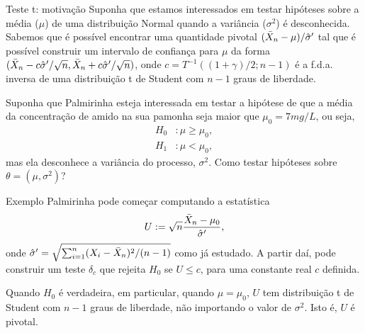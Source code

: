 \begin{frame}{Teste t: motivação}
 Suponha que estamos interessados em testar hipóteses sobre a média ($\mu$) de uma distribuição Normal quando a variância ($\sigma^2$) é desconhecida.
 Sabemos que é possível encontrar uma quantidade pivotal $(\bar{X}_n-\mu)/\hat{\sigma}^\prime$ tal que é possível construir um intervalo de confiança para $\mu$ da forma $( \bar{X}_n - c\hat{\sigma}^\prime/\sqrt{n}, \bar{X}_n + c\hat{\sigma}^\prime/\sqrt{n} )$, onde $c = T^{-1}((1 + \gamma)/2; n-1)$ é a f.d.a. inversa de uma distribuição t de Student com $n-1$ graus de liberdade.
 
 \begin{pergunta}
 \label{qst:unknown_mean_and_variance}
  Suponha que Palmirinha esteja interessada em testar a hipótese de que a média da concentração de amido na sua pamonha seja maior que $\mu_0 = 7 mg/L$, ou seja,
    \begin{align*}
   H_0 &: \mu \geq \mu_0, \\
   H_1&:  \mu < \mu_0,
  \end{align*}
  mas ela desconhece a variância do processo, $\sigma^2$.
  Como testar hipóteses sobre $\theta = (\mu, \sigma^2)$?
 \end{pergunta} 
\end{frame}

\begin{frame}{Exemplo}
 Palmirinha pode começar computando a estatística 
 \begin{equation*}
  U:= \sqrt{n}\frac{\bar{X}_n-\mu_0}{\hat{\sigma}^\prime},
 \end{equation*}
onde $\hat{\sigma}^\prime = \sqrt{\sum_{i=1}^n (X_i - \bar{X}_n)^2/(n-1)}$ como já estudado.
A partir daí, pode construir um teste $\delta_c$ que rejeita $H_0$ se $U \leq c$, para uma constante real $c$ definida.
\begin{obs}
 Quando $H_0$ é verdadeira, em particular, quando $\mu = \mu_0$, $U$ tem distribuição t de Student com $n-1$ graus de liberdade, não importando o valor de $\sigma^2$.
 Isto é, $U$ é pivotal.
\end{obs}
\end{frame}



